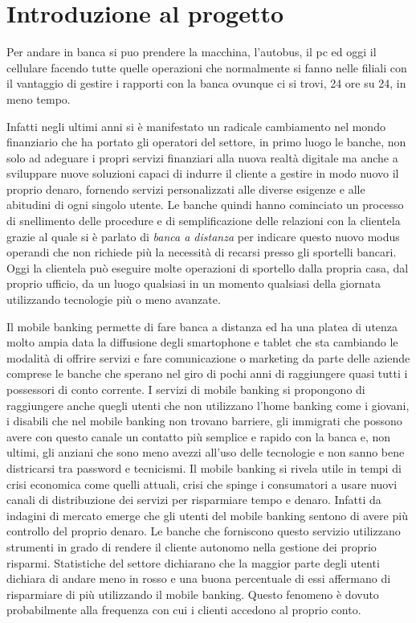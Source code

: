 \chapter{Introduzione al progetto}
Per andare in banca si puo prendere la macchina, l’autobus, il  pc ed oggi il cellulare facendo tutte quelle operazioni che normalmente si fanno nelle filiali con il vantaggio di gestire i rapporti con la banca ovunque ci si trovi, 24 ore su 24, in meno tempo.
 
Infatti negli ultimi anni  si è manifestato un radicale cambiamento nel mondo finanziario che ha portato gli operatori del settore, in primo luogo le banche, non solo ad adeguare i propri servizi finanziari alla nuova realtà digitale ma anche a sviluppare nuove soluzioni capaci di indurre il cliente a gestire in modo nuovo il proprio denaro, fornendo servizi personalizzati alle diverse esigenze e alle abitudini di ogni singolo utente.
Le banche quindi hanno cominciato un processo di snellimento delle procedure e di semplificazione delle relazioni con la clientela grazie al quale si è parlato di \emph{banca a distanza} per indicare questo nuovo modus operandi che non richiede più la necessità di recarsi presso gli sportelli bancari.
Oggi la clientela può eseguire molte operazioni di sportello dalla propria casa, dal proprio ufficio, da un luogo qualsiasi in un momento qualsiasi della giornata utilizzando tecnologie più o meno avanzate.

Il mobile banking permette di fare banca a distanza ed ha una platea di utenza molto ampia data la diffusione degli smartophone e tablet che sta cambiando le modalità di offrire servizi e fare comunicazione o marketing da parte delle aziende comprese le banche che sperano nel giro di pochi anni di raggiungere quasi tutti i possessori di conto corrente. I servizi di mobile banking si propongono di raggiungere anche quegli utenti che non utilizzano l’home banking come i giovani, i disabili che nel mobile banking  non trovano barriere, gli immigrati che possono avere con questo canale un contatto più semplice e rapido con la banca e, non ultimi, gli anziani che sono meno avezzi all’uso delle tecnologie e non sanno bene districarsi tra password e tecnicismi.
Il mobile banking si rivela utile in tempi di crisi economica come quelli attuali, crisi che spinge i consumatori a usare nuovi canali di distribuzione dei servizi per risparmiare tempo e denaro. Infatti da indagini di mercato emerge che gli utenti del mobile banking sentono di avere più controllo del proprio denaro.
Le banche che forniscono questo servizio utilizzano strumenti in grado di rendere il cliente autonomo nella gestione dei proprio risparmi. Statistiche del settore dichiarano che la maggior parte degli utenti dichiara di andare meno in rosso e una buona percentuale di essi affermano di risparmiare di più utilizzando il mobile banking. Questo fenomeno è dovuto probabilmente alla frequenza con cui i clienti accedono al proprio conto. 

